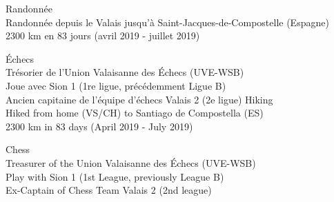 \ifFrench
  \normalsize
  \color{deepgray}
  Randonnée \\
  \color{mediumgray} \small
  Randonnée depuis le Valais jusqu'à Saint-Jacques-de-Compostelle (Espagne) \\
  2300 km en 83 jours (avril 2019 - juillet 2019)
  \vfill

  \color{deepgray}
  \normalsize
  Échecs \\
  \color{mediumgray} \small
  Trésorier de l'Union Valaisanne des Échecs (UVE-WSB) \\
  Joue avec Sion 1 (1re ligue, précédemment Ligue B) \\
  Ancien capitaine de l'équipe d'échecs Valais 2 (2e ligue)
\else
  \normalsize
  \color{deepgray}
  Hiking \\
  \color{mediumgray} \small
  Hiked from home (VS/CH) to Santiago de Compostella (ES) \\
  2300 km in 83 days (April 2019 - July 2019)
  \vfill

  \color{deepgray}
  \normalsize
  Chess \\
  \color{mediumgray} \small
  Treasurer of the Union Valaisanne des Échecs (UVE-WSB) \\
  Play with Sion 1 (1st League, previously League B) \\
  Ex-Captain of Chess Team Valais 2 (2nd league)
\fi